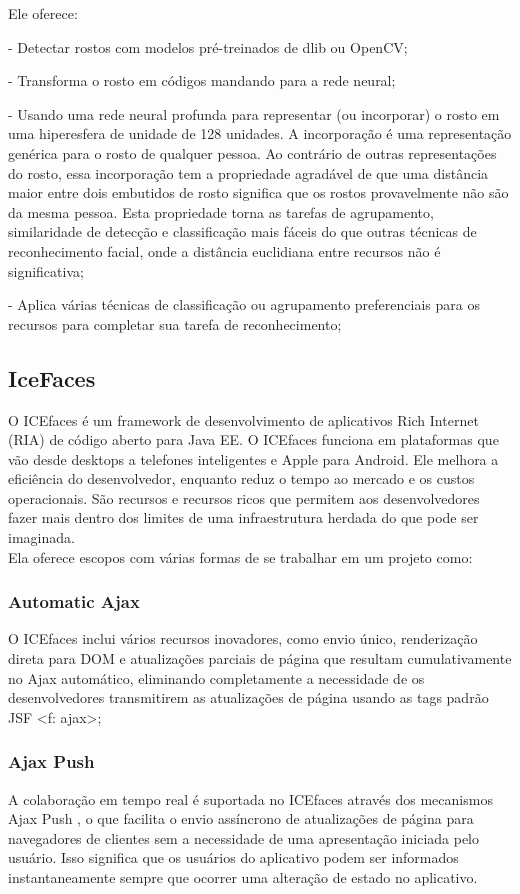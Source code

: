 \documentclass[12pt,a4paper]{article}
\begin{document}
Ele oferece:

- Detectar rostos com modelos pré-treinados de dlib ou OpenCV;

- Transforma o rosto em códigos mandando para a rede neural;

- Usando uma rede neural profunda para representar (ou incorporar) o rosto em uma hiperesfera de unidade de 128 unidades. A incorporação é uma representação genérica para o rosto de qualquer pessoa. Ao contrário de outras representações do rosto, essa incorporação tem a propriedade agradável de que uma distância maior entre dois embutidos de rosto significa que os rostos provavelmente não são da mesma pessoa. Esta propriedade torna as tarefas de agrupamento, similaridade de detecção e classificação mais fáceis do que outras técnicas de reconhecimento facial, onde a distância euclidiana entre recursos não é significativa;

- Aplica várias técnicas de classificação ou agrupamento preferenciais para os recursos para completar sua tarefa de reconhecimento;

\subsection{IceFaces}
O ICEfaces é um framework de desenvolvimento de aplicativos Rich Internet (RIA) de código aberto para Java EE. O ICEfaces funciona em plataformas que vão desde desktops a telefones inteligentes e Apple para Android. Ele melhora a eficiência do desenvolvedor, enquanto reduz o tempo ao mercado e os custos operacionais. São recursos e recursos ricos que permitem aos desenvolvedores fazer mais dentro dos limites de uma infraestrutura herdada do que pode ser imaginada. 
\\

Ela oferece escopos com várias formas de se trabalhar em um projeto como:

\subsubsection{Automatic Ajax}
O ICEfaces inclui vários recursos inovadores, como envio único, renderização direta para DOM e atualizações parciais de página que resultam cumulativamente no Ajax automático, eliminando completamente a necessidade de os desenvolvedores transmitirem as atualizações de página usando as tags padrão JSF <f: ajax>;

\subsubsection{Ajax Push}
A colaboração em tempo real é suportada no ICEfaces através dos mecanismos Ajax Push , o que facilita o envio assíncrono de atualizações de página para navegadores de clientes sem a necessidade de uma apresentação iniciada pelo usuário. Isso significa que os usuários do aplicativo podem ser informados instantaneamente sempre que ocorrer uma alteração de estado no aplicativo.
\end{document}
